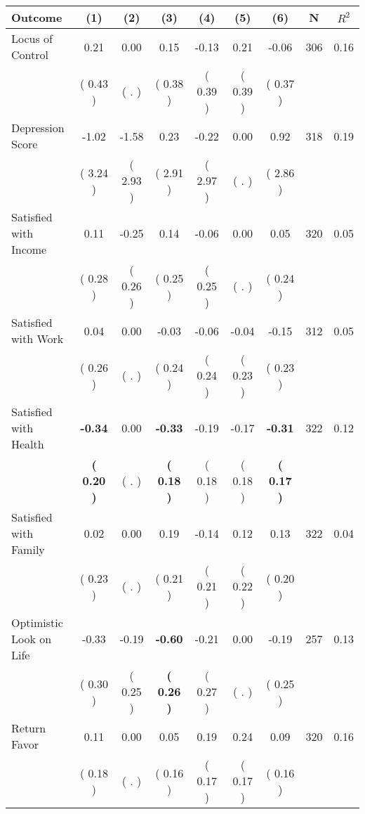 \begin{tabular}{lcccccccc}
\toprule
 \textbf{Outcome} & \textbf{(1)} & \textbf{(2)} & \textbf{(3)} & \textbf{(4)} & \textbf{(5)} & \textbf{(6)} & \textbf{N} & \textbf{$ R^2$} \\
\midrule
Locus of Control &      0.21 &      0.00 &      0.15 &     -0.13 &      0.21 &     -0.06 & 306 &       0.16 \\ 
 & (     0.43 ) & (        . ) & (     0.38 ) & (     0.39 ) & (     0.39 ) & (     0.37 ) & \\
Depression Score &     -1.02 &     -1.58 &      0.23 &     -0.22 &      0.00 &      0.92 & 318 &       0.19 \\ 
 & (     3.24 ) & (     2.93 ) & (     2.91 ) & (     2.97 ) & (        . ) & (     2.86 ) & \\
Satisfied with Income &      0.11 &     -0.25 &      0.14 &     -0.06 &      0.00 &      0.05 & 320 &       0.05 \\ 
 & (     0.28 ) & (     0.26 ) & (     0.25 ) & (     0.25 ) & (        . ) & (     0.24 ) & \\
Satisfied with Work &      0.04 &      0.00 &     -0.03 &     -0.06 &     -0.04 &     -0.15 & 312 &       0.05 \\ 
 & (     0.26 ) & (        . ) & (     0.24 ) & (     0.24 ) & (     0.23 ) & (     0.23 ) & \\
Satisfied with Health & \textbf{    -0.34} &      0.00 & \textbf{    -0.33} &     -0.19 &     -0.17 & \textbf{    -0.31} & 322 &       0.12 \\ 
 & \textbf{(     0.20 )} & (        . ) & \textbf{(     0.18 )} & (     0.18 ) & (     0.18 ) & \textbf{(     0.17 )} & \\
Satisfied with Family &      0.02 &      0.00 &      0.19 &     -0.14 &      0.12 &      0.13 & 322 &       0.04 \\ 
 & (     0.23 ) & (        . ) & (     0.21 ) & (     0.21 ) & (     0.22 ) & (     0.20 ) & \\
Optimistic Look on Life &     -0.33 &     -0.19 & \textbf{    -0.60} &     -0.21 &      0.00 &     -0.19 & 257 &       0.13 \\ 
 & (     0.30 ) & (     0.25 ) & \textbf{(     0.26 )} & (     0.27 ) & (        . ) & (     0.25 ) & \\
Return Favor &      0.11 &      0.00 &      0.05 &      0.19 &      0.24 &      0.09 & 320 &       0.16 \\ 
 & (     0.18 ) & (        . ) & (     0.16 ) & (     0.17 ) & (     0.17 ) & (     0.16 ) & \\

\end{tabular}
